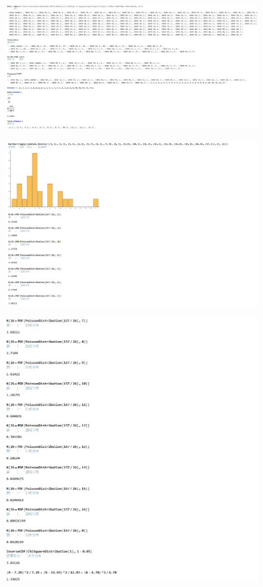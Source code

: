 \documentclass[12pt]{article}
\begin{document}
\begin{enumerate}[-]
\begin{figure}[H]
\includegraphics[scale=0.3]{MQ7-1.jpg}
\end{figure}
\begin{figure}[H]
\includegraphics[scale=0.3]{MQ7-2.jpg}
\end{figure}
\begin{figure}[H]
\includegraphics[scale=0.3]{MQ7-3.jpg}
\end{figure}
\end{enumerate}
\end{document}
